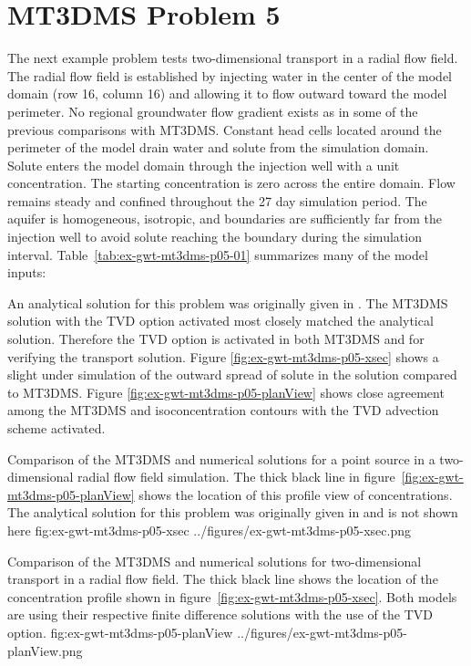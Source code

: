 \section{MT3DMS Problem 5}

The next example problem tests two-dimensional transport in a radial flow field.  The radial flow field is established by injecting water in the center of the model domain (row 16, column 16) and allowing it to flow outward toward the model perimeter. No regional groundwater flow gradient exists as in some of the previous comparisons with MT3DMS. Constant head cells located around the perimeter of the model drain water and solute from the simulation domain. Solute enters the model domain through the injection well with a unit concentration.  The starting concentration is zero across the entire domain. Flow remains steady and confined throughout the 27 day simulation period. The aquifer is homogeneous, isotropic, and boundaries are sufficiently far from the injection well to avoid solute reaching the boundary during the simulation interval. Table~\ref{tab:ex-gwt-mt3dms-p05-01} summarizes many of the model inputs:



An analytical solution for this problem was originally given in \cite{moench1981}. The MT3DMS solution with the TVD option activated most closely matched the analytical solution.  Therefore the TVD option is activated in both MT3DMS and \mf for verifying the transport solution. Figure \ref{fig:ex-gwt-mt3dms-p05-xsec} shows a slight under simulation of the outward spread of solute in the \mf solution compared to MT3DMS. Figure \ref{fig:ex-gwt-mt3dms-p05-planView} shows close agreement among the MT3DMS and \mf isoconcentration contours with the TVD advection scheme activated. 

\begin{StandardFigure}
	{Comparison of the MT3DMS and \mf numerical solutions for a point source in a two-dimensional radial flow field simulation.  The thick black line in figure~\ref{fig:ex-gwt-mt3dms-p05-planView} shows the location of this profile view of concentrations.  The analytical solution for this problem was originally given in \citep{moench1981} and is not shown here} 
	{fig:ex-gwt-mt3dms-p05-xsec}
	{../figures/ex-gwt-mt3dms-p05-xsec.png}
\end{StandardFigure}

\begin{StandardFigure}
	{Comparison of the MT3DMS and \mf numerical solutions for two-dimensional transport in a radial flow field.  The thick black line shows the location of the concentration profile shown in figure~\ref{fig:ex-gwt-mt3dms-p05-xsec}. Both models are using their respective finite difference solutions with the use of the TVD option.} 
	{fig:ex-gwt-mt3dms-p05-planView}
	{../figures/ex-gwt-mt3dms-p05-planView.png}
\end{StandardFigure}
